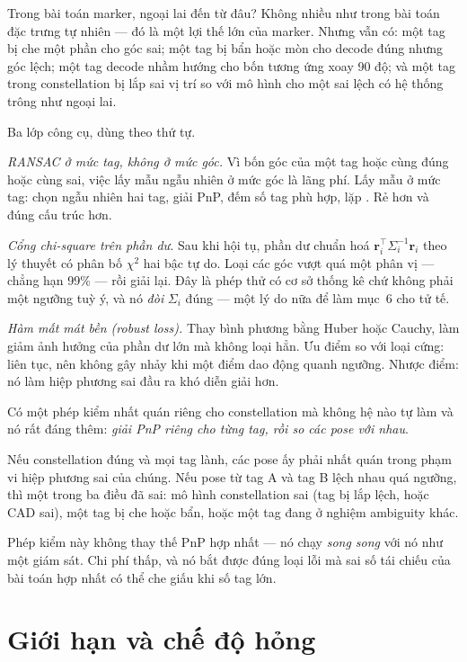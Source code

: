 \documentclass[../../marker.tex]{subfiles}
\begin{document}
Trong bài toán marker, ngoại lai đến từ đâu? Không nhiều như trong bài toán đặc trưng tự nhiên --- đó là một lợi thế lớn của marker. Nhưng vẫn có: một tag bị che một phần cho góc sai; một tag bị bẩn hoặc mòn cho decode đúng nhưng góc lệch; một tag decode nhầm hướng cho bốn tương ứng xoay 90 độ; và một tag trong constellation bị lắp sai vị trí so với mô hình cho một sai lệch có hệ thống trông như ngoại lai.

Ba lớp công cụ, dùng theo thứ tự.

\emph{RANSAC ở mức tag, không ở mức góc.} Vì bốn góc của một tag hoặc cùng đúng hoặc cùng sai, việc lấy mẫu ngẫu nhiên ở mức góc là lãng phí. Lấy mẫu ở mức tag: chọn ngẫu nhiên hai tag, giải PnP, đếm số tag phù hợp, lặp \cite{fischler1981ransac}. Rẻ hơn và đúng cấu trúc hơn.

\emph{Cổng chi-square trên phần dư.} Sau khi hội tụ, phần dư chuẩn hoá \(\mathbf{r}_i^\top\Sigma_i^{-1}\mathbf{r}_i\) theo lý thuyết có phân bố \(\chi^2\) hai bậc tự do. Loại các góc vượt quá một phân vị --- chẳng hạn 99\% --- rồi giải lại. Đây là phép thử có cơ sở thống kê chứ không phải một ngưỡng tuỳ ý, và nó \emph{đòi} \(\Sigma_i\) đúng --- một lý do nữa để làm mục~6 cho tử tế.

\emph{Hàm mất mát bền (robust loss).} Thay bình phương bằng Huber hoặc Cauchy, làm giảm ảnh hưởng của phần dư lớn mà không loại hẳn. Ưu điểm so với loại cứng: liên tục, nên không gây nhảy khi một điểm dao động quanh ngưỡng. Nhược điểm: nó làm hiệp phương sai đầu ra khó diễn giải hơn.

\begin{cannho}
Có một phép kiểm nhất quán riêng cho constellation mà không hệ nào tự làm và nó rất đáng thêm: \emph{giải PnP riêng cho từng tag, rồi so các pose với nhau}.

Nếu constellation đúng và mọi tag lành, các pose ấy phải nhất quán trong phạm vi hiệp phương sai của chúng. Nếu pose từ tag A và tag B lệch nhau quá ngưỡng, thì một trong ba điều đã sai: mô hình constellation sai (tag bị lắp lệch, hoặc CAD sai), một tag bị che hoặc bẩn, hoặc một tag đang ở nghiệm ambiguity khác.

Phép kiểm này không thay thế PnP hợp nhất --- nó chạy \emph{song song} với nó như một giám sát. Chi phí thấp, và nó bắt được đúng loại lỗi mà sai số tái chiếu của bài toán hợp nhất có thể che giấu khi số tag lớn.
\end{cannho}

\section{Giới hạn và chế độ hỏng}
\end{document}
